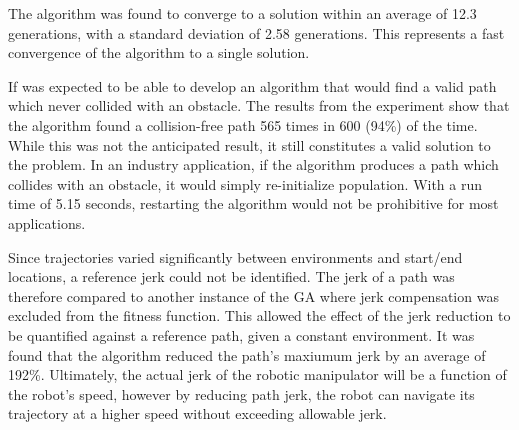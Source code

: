 The algorithm was found to converge to a solution within an average of 12.3 generations, with a standard deviation of 2.58 generations. This represents a fast convergence of the algorithm to a single solution.

If was expected to be able to develop an algorithm that would find a valid path which never collided with an obstacle. The results from the experiment show that the algorithm found a collision-free path 565 times in 600 (94\%) of the time. While this was not the anticipated result, it still constitutes a valid solution to the problem. In an industry application, if the algorithm produces a path which collides with an obstacle, it would simply re-initialize population. With a run time of 5.15 seconds, restarting the algorithm would not be prohibitive for most applications.

Since trajectories varied significantly between environments and start/end locations, a reference jerk could not be identified. The jerk of a path was therefore compared to another instance of the GA where jerk compensation was excluded from the fitness function. This allowed the effect of the jerk reduction to be quantified against a reference path, given a constant environment. It was found that the algorithm reduced the path's maxiumum jerk by an average of 192\%. Ultimately, the actual jerk of the robotic manipulator will be a function of the robot's speed, however by reducing path jerk, the robot can navigate its trajectory at a higher speed without exceeding allowable jerk.